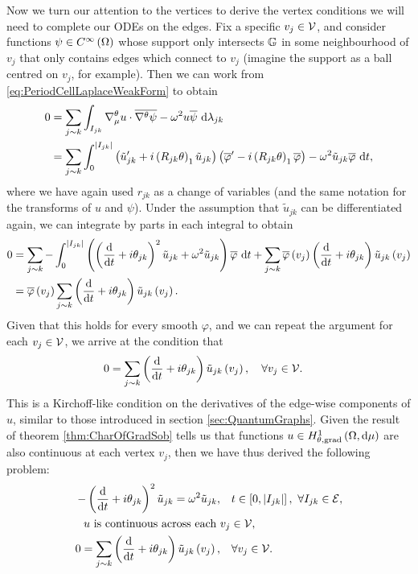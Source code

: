 Now we turn our attention to the vertices to derive the vertex conditions we will need to complete our ODEs on the edges. 
Fix a specific $v_j\in \mathcal{V}$, and consider functions $\psi\in C^{\infty}\left( \Omega \right)$ whose support only intersects $\mathbb{G}$ in some neighbourhood of $v_j$ that only contains edges which connect to $v_j$ (imagine the support as a ball centred on $v_j$, for example).
Then we can work from \eqref{eq:PeriodCellLaplaceWeakForm} to obtain
\begin{align*}
	0 &= \sum_{j\sim k} \int_{I_{jk}} \nabla^{\theta}_\mu u \cdot \overline{\nabla^{\theta}\psi} - \omega^2 u\overline{\psi}  \ \mathrm{d}\lambda_{jk} \\
	&= \sum_{j\sim k} \int_{0}^{\left\lvert I_{jk} \right\rvert} \left( \tilde{u}_{jk}' + i\left( R_{jk}\theta \right)_1 \tilde{u}_{jk} \right)\left( \overline{\varphi}' - i\left( R_{jk}\theta \right)_1 \overline{\varphi}  \right) - \omega^2 \tilde{u}_{jk}\overline{\varphi} \ \mathrm{d} t,
\end{align*}
where we have again used $r_{jk}$ as a change of variables (and the same notation for the transforms of $u$ and $\psi$).
Under the assumption that $\tilde{u}_{jk}$ can be differentiated again, we can integrate by parts in each integral to obtain
\begin{align*}
	0 &= \sum_{j\sim k} - \int_{0}^{\left\lvert I_{jk} \right\rvert} \left(  \left( \dfrac{\mathrm{d}}{\mathrm{d}t} + i\theta_{jk} \right)^2 \tilde{u}_{jk} +\omega^2 \tilde{u}_{jk}  \right)\overline{\varphi} \ \mathrm{d} t
	+ \sum_{j\sim k}\overline{\varphi}\left( v_j \right)\left( \dfrac{\mathrm{d}}{\mathrm{d}t} + i\theta_{jk} \right)\tilde{u}_{jk}\left( v_j \right) \\
	&= \overline{\varphi}\left( v_j \right)\sum_{j\sim k}\left( \dfrac{\mathrm{d}}{\mathrm{d}t} + i\theta_{jk} \right)\tilde{u}_{jk}\left( v_j \right).
\end{align*}
Given that this holds for every smooth $\varphi$, and we can repeat the argument for each $v_j\in \mathcal{V}$, we arrive at the condition that 
\begin{align*}
	0 &= \sum_{j\sim k}\left( \dfrac{\mathrm{d}}{\mathrm{d}t} + i\theta_{jk} \right)\tilde{u}_{jk}\left( v_j \right), \quad \forall v_j \in \mathcal{V}.
\end{align*}
This is a Kirchoff-like condition on the derivatives of the edge-wise components of $u$, similar to those introduced in section \ref{sec:QuantumGraphs}.
Given the result of theorem \ref{thm:CharOfGradSob} tells us that functions $u\in H^1_{\theta, \mathrm{grad}}\left( \Omega, \mathrm{d}\mu \right)$ are also continuous at each vertex $v_j$, then we have thus derived the following problem:
\begin{align*}
	-\left( \dfrac{\mathrm{d}}{\mathrm{d}t} + i\theta_{jk} \right)^2 \tilde{u}_{jk} = \omega^2 \tilde{u}_{jk}, &\quad t\in\left[ 0,\left\lvert I_{jk} \right\rvert \right], \ \forall I_{jk}\in \mathcal{E}, \\
	u \text{ is continuous across each } &v_j \in \mathcal{V}, \\
	0 = \sum_{j\sim k}\left( \dfrac{\mathrm{d}}{\mathrm{d}t} + i\theta_{jk} \right)\tilde{u}_{jk}\left( v_j \right), &\quad \forall v_j \in \mathcal{V}.
\end{align*}
